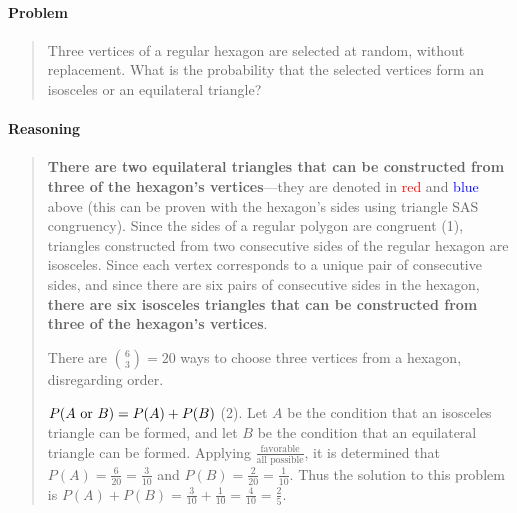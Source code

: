 \documentclass[letterpaper,12pt,twoside]{report}
\begin{document}
	\pagestyle{fancy}
	\fancyhf{}
	
	\paragraph{Problem}
	\begin{quote}
		\textsf{Three vertices of a regular hexagon are selected at random, without replacement. What is the probability that the selected vertices form an isosceles or an equilateral triangle?}
	\end{quote}
	
	\begin{center}
	\end{center}
	
	\paragraph{Reasoning}
	\begin{quotation}
		
		\textbf{There are two equilateral triangles that can be constructed from three of the hexagon's vertices}---they are denoted in \textcolor{red}{red} and \textcolor{blue}{blue} above (this can be proven with the hexagon's sides using triangle SAS congruency). Since the sides of a regular polygon are congruent (1), triangles constructed from two consecutive sides of the regular hexagon are isosceles. Since each vertex corresponds to a unique pair of consecutive sides, and since there are six pairs of consecutive sides in the hexagon, \textbf{there are six isosceles triangles that can be constructed from three of the hexagon's vertices}.
		
		There are $\binom{6}{3}=20$ ways to choose three vertices from a hexagon, disregarding order.
		
		$P(A \textrm{\space or } B)=P(A)+P(B)$ (2). Let $A$ be the condition that an isosceles triangle can be formed, and let $B$ be the condition that an equilateral triangle can be formed. Applying $\frac{\text{favorable}}{\text{all possible}}$, it is determined that $P(A)=\frac{6}{20}=\frac{3}{10}$ and $P(B)=\frac{2}{20}=\frac{1}{10}$. Thus the solution to this problem is $P(A)+P(B)=\frac{3}{10}+\frac{1}{10}=\frac{4}{10}=\boxed{\frac{2}{5}}$.
		
	\end{quotation}
	
\end{document}
